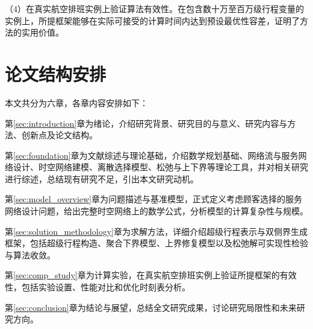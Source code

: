 （4）在真实航空排班实例上验证算法有效性。在包含数十万至百万级行程变量的实例上，所提\algoNotation 框架能够在实际可接受的计算时间内达到预设最优性容差，证明了方法的实用价值。

\section{论文结构安排}

本文共分为六章，各章内容安排如下：

第\ref{sec:introduction}章为绪论，介绍研究背景、研究目的与意义、研究内容与方法、创新点及论文结构。

第\ref{sec:foundation}章为文献综述与理论基础，介绍数学规划基础、网络流与服务网络设计、时空网络建模、离散选择模型、松弛与上下界等理论工具，并对相关研究进行综述，总结现有研究不足，引出本文研究动机。

第\ref{sec:model_overview}章为问题描述与基准模型，正式定义考虑顾客选择的服务网络设计问题，给出完整时空网络上的数学公式，分析模型的计算复杂性与规模。

第\ref{sec:solution_methodology}章为求解方法，详细介绍超级行程表示与双侧界生成框架，包括超级行程构造、聚合下界模型、上界修复模型以及松弛解可实现性检验与算法收敛。

第\ref{sec:comp_study}章为计算实验，在真实航空排班实例上验证所提框架的有效性，包括实验设置、性能对比和优化时刻表分析。

第\ref{sec:conclusion}章为结论与展望，总结全文研究成果，讨论研究局限性和未来研究方向。
